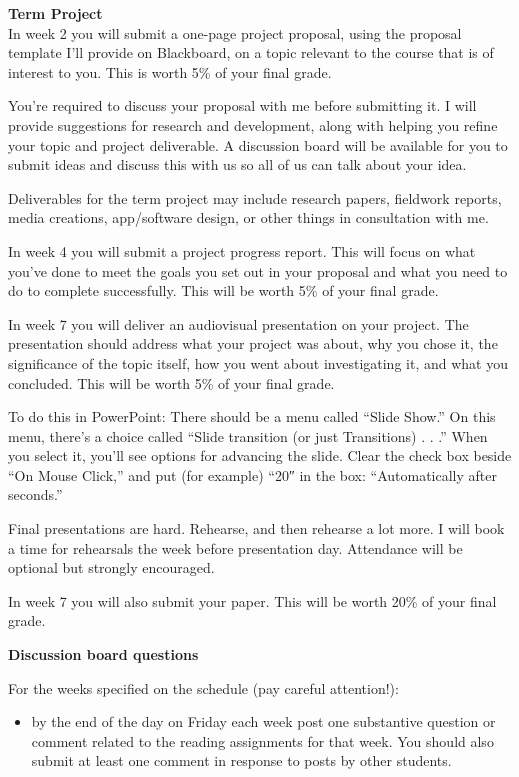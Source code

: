 \documentclass[]{tufte-handout}
\providecommand{\tightlist}{%
  \setlength{\itemsep}{0pt}\setlength{\parskip}{0pt}}
\begin{document}
\textbf{Term Project}\\
In week 2 you will submit a one-page project proposal, using the
proposal template I'll provide on Blackboard, on a topic relevant to the
course that is of interest to you. This is worth 5\% of your final
grade.

You're required to discuss your proposal with me before submitting it. I
will provide suggestions for research and development, along with
helping you refine your topic and project deliverable. A discussion
board will be available for you to submit ideas and discuss this with us
so all of us can talk about your idea.

Deliverables for the term project may include research papers, fieldwork
reports, media creations, app/software design, or other things in
consultation with me.

In week 4 you will submit a project progress report. This will focus on
what you've done to meet the goals you set out in your proposal and what
you need to do to complete successfully. This will be worth 5\% of your
final grade.

In week 7 you will deliver an audiovisual presentation on your project.
The presentation should address what your project was about, why you
chose it, the significance of the topic itself, how you went about
investigating it, and what you concluded. This will be worth 5\% of your
final grade.

To do this in PowerPoint: There should be a menu called ``Slide Show.''
On this menu, there's a choice called ``Slide transition (or just
Transitions) . . .'' When you select it, you'll see options for
advancing the slide. Clear the check box beside ``On Mouse Click,'' and
put (for example) ``20″ in the box: ``Automatically after seconds.''

Final presentations are hard. Rehearse, and then rehearse a lot more. I
will book a time for rehearsals the week before presentation day.
Attendance will be optional but strongly encouraged.

In week 7 you will also submit your paper. This will be worth 20\% of
your final grade.

\textbf{Discussion board questions}

For the weeks specified on the schedule (pay careful attention!):

\begin{itemize}
\tightlist
\item
  by the end of the day on Friday each week post one substantive
  question or comment related to the reading assignments for that week.
  You should also submit at least one comment in response to posts by
  other students.
\end{itemize}
\end{document}

